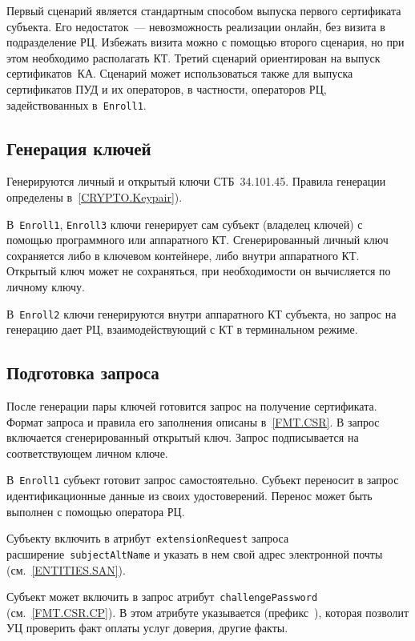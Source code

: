 Первый сценарий является стандартным способом выпуска первого сертификата
субъекта.  Его недостаток~--- невозможность реализации онлайн, 
без визита в подразделение РЦ. 
%
Избежать визита можно с помощью второго сценария, но при этом необходимо 
располагать КТ.
%
Третий сценарий ориентирован на выпуск сертификатов~КА.
%
Сценарий может использоваться также для выпуска сертификатов ПУД и их 
операторов, в частности, операторов РЦ, задействованных 
в~\texttt{Enroll1}.

\subsection{Генерация ключей}\label{PROCESSES.Enroll.Gen}

Генерируются личный и открытый ключи СТБ~34.101.45.
Правила генерации определены в~\ref{CRYPTO.Keypair}).

В~\texttt{Enroll1}, \texttt{Enroll3} ключи генерирует сам субъект 
(владелец ключей) с помощью программного или аппаратного КТ. 
Сгенерированный личный ключ сохраняется либо в ключевом контейнере, 
либо внутри аппаратного КТ. Открытый ключ может не сохраняться, 
при необходимости он вычисляется по личному ключу.

В~\texttt{Enroll2} ключи генерируются внутри аппаратного КТ субъекта,
но запрос на генерацию дает РЦ, взаимодействующий с КТ в терминальном 
режиме. 

\subsection{Подготовка запроса}\label{PROCESSES.Enroll.CSR}

После генерации пары ключей готовится запрос на получение сертификата. 
Формат запроса и правила его заполнения описаны в~\ref{FMT.CSR}. 
В запрос включается сгенерированный открытый ключ. Запрос подписывается на 
соответствующем личном ключе.

В~\texttt{Enroll1} субъект готовит запрос самостоятельно.
Субъект переносит в запрос идентификационные данные из своих 
удостоверений. Перенос может быть выполнен с помощью оператора РЦ.

Субъекту  включить 
в атрибут~\texttt{extensionRequest} запроса расширение~\texttt{subjectAltName} 
и указать в нем свой адрес электронной почты (см.~\ref{ENTITIES.SAN}).

Субъект может включить в запрос атрибут~\texttt{challengePassword} 
(см.~\ref{FMT.CSR.CP}). В этом атрибуте указывается  (префикс~), которая позволит УЦ проверить факт 
оплаты услуг доверия, другие факты. 

